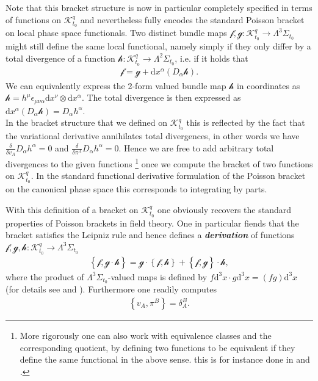 \documentclass[a4paper,12pt, DIV=14, BCOR=5mm, twoside, headsepline]{scrbook}
\begin{document}
Note that this bracket structure is now in particular completely specified in terms of functions on $\mathcal{K}^q_{t_0}$ and nevertheless fully encodes the standard Poisson bracket on local phase space functionals. Two distinct bundle maps $\mathcal{f},\mathcal{g} : \mathcal{K}^q_{t_0} \rightarrow \Lambda^3\Sigma_{t_0}$ might still define the same local functional, namely simply if they only differ by a total divergence of a function $\mathcal{h}: \mathcal{K}^q_{t_0} \rightarrow \Lambda^2\Sigma_{t_0}$, i.e. if it holds that 
\begin{align}
\mathcal{f} = \mathcal{g} +\mathrm{d}x^{\alpha}(D_{\alpha} \mathcal{h}).
\end{align}
We can equivalently express the 2-form valued bundle map $\mathcal{h}$ in coordinates as $\mathcal{h} = h^{\mu} \epsilon_{\mu \nu \alpha} \mathrm{d}x^{\nu} \otimes \mathrm{d}x^{\alpha}$. The total divergence is then expressed as $\mathrm{d}x^{\alpha}(D_{\alpha} \mathcal{h}) = D_{\alpha} h^{\alpha}$. \\

In the bracket structure that we defined on $\mathcal{K}^q_{t_0}$ this is reflected by the fact that the variational derivative annihilates total divergences, in other words we have $\frac{\delta}{\delta v_A}D_{\alpha} h^{\alpha} = 0$ and $\frac{\delta}{\delta \pi^A}D_{\alpha} h^{\alpha}=0$. Hence we are free to add arbitrary total divergences to the given functions \footnote{More rigorously one can also work with equivalence classes and the corresponding quotient, by defining two functions to be equivalent if they define the same functional in the above sense. this is for instance done in \cite{1997hep.th....9164B} and \cite{Barnich1998}.} once we compute the bracket of two functions on $\mathcal{K}^q_{t_0}$. In the standard functional derivative formulation of the Poisson bracket on the canonical phase space this corresponds to integrating by parts. 

With this definition of a bracket on $\mathcal{K}^q_{t_0}$ one obviously recovers the standard properties of Poisson brackets in field theory.
One in particular fiends that the bracket satisfies the Leipniz rule and hence defines a \textit{\textbf{derivation}} of functions $\mathcal{f},\mathcal{g},\mathcal{h} : \mathcal{K}^q_{t_0} \rightarrow \Lambda^3\Sigma_{t_0}$ 
\begin{align}
\left \{\mathcal{f}, \mathcal{g}\cdot \mathcal{h} \right \} = \mathcal{g} \cdot \left \{ \mathcal{f}, \mathcal{h} \right \} + \left \{ \mathcal{f} , \mathcal{g}\right \} \cdot \mathcal{h},
\end{align}
where the product of $\Lambda^3\Sigma_{t_0}$-valued maps is defined by $f \mathrm{d}^3x \cdot g\mathrm{d}^3x = (fg)\mathrm{d}^3x$ (for details see \cite{1997hep.th....9164B} and \cite{Barnich1998}). Furthermore one readily computes 
\begin{align}
\left \{ v_A, \pi^B\right \} = \delta_A^B.
\end{align}
\end{document}
